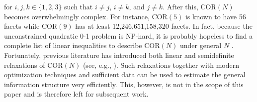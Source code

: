 \documentclass[12pt]{article}
\newcommand{\COR}{\text{COR}}
\theoremstyle{definition}
\theoremstyle{definition}
\begin{document}
for $i,j,k \in \{1,2,3\}$ such that $i \neq j$, $i \neq k$, and $j \neq k$. After this, $\COR(N)$ becomes overwhelmingly complex. For instance, $\COR(5)$ is known to have 56 facets while $\COR(9)$ has at least 12,246,651,158,320 facets. In fact, because the unconstrained quadratic
0-1 problem is NP-hard, it is probably hopeless to find a complete
list of linear inequalities to describe $\COR(N)$ under general $N$
\citep{deza1997geometry}. Fortunately, previous literature has introduced both linear and semidefinite relaxations of $\COR(N)$ (see, e.g., \citealt{laurent1997connections}). Such relaxations together with modern optimization techniques and sufficient data can be used to estimate the general information structure very efficiently. This, however, is not in the scope of this paper and is therefore left for subsequent work. 
\end{document}
